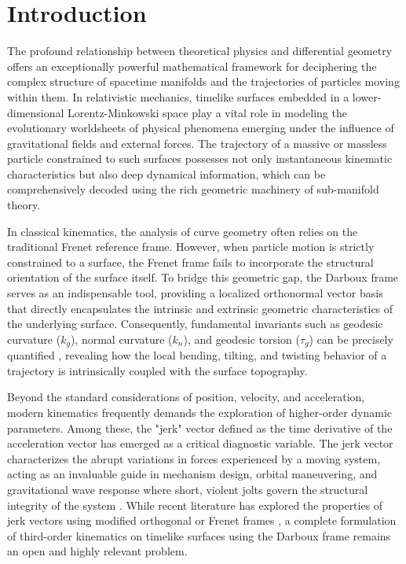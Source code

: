 \documentclass[reqno]{amsart}
\theoremstyle{plain}
\numberwithin{equation}{section}
\begin{document}
\section{Introduction}

The profound relationship between theoretical physics and differential geometry offers an exceptionally powerful mathematical framework for deciphering the complex structure of spacetime manifolds and the trajectories of particles moving within them. In relativistic mechanics, timelike surfaces embedded in a lower-dimensional Lorentz-Minkowski space play a vital role in modeling the evolutionary worldsheets of physical phenomena emerging under the influence of gravitational fields and external forces. The trajectory of a massive or massless particle constrained to such surfaces possesses not only instantaneous kinematic characteristics but also deep dynamical information, which can be comprehensively decoded using the rich geometric machinery of sub-manifold theory.

In classical kinematics, the analysis of curve geometry often relies on the traditional Frenet reference frame. However, when particle motion is strictly constrained to a surface, the Frenet frame fails to incorporate the structural orientation of the surface itself. To bridge this geometric gap, the Darboux frame serves as an indispensable tool, providing a localized orthonormal vector basis that directly encapsulates the intrinsic and extrinsic geometric characteristics of the underlying surface. Consequently, fundamental invariants such as geodesic curvature ($k_g$), normal curvature ($k_n$), and geodesic torsion ($\tau_g$) can be precisely quantified \cite{4,12}, revealing how the local bending, tilting, and twisting behavior of a trajectory is intrinsically coupled with the surface topography.

Beyond the standard considerations of position, velocity, and acceleration, modern kinematics frequently demands the exploration of higher-order dynamic parameters. Among these, the "jerk" vector defined as the time derivative of the acceleration vector has emerged as a critical diagnostic variable. The jerk vector characterizes the abrupt variations in forces experienced by a moving system, acting as an invaluable guide in mechanism design, orbital maneuvering, and gravitational wave response where short, violent jolts govern the structural integrity of the system \cite{3,5,11}. While recent literature has explored the properties of jerk vectors using modified orthogonal or Frenet frames \cite{8,9}, a complete formulation of third-order kinematics on timelike surfaces using the Darboux frame remains an open and highly relevant problem.
\end{document}

